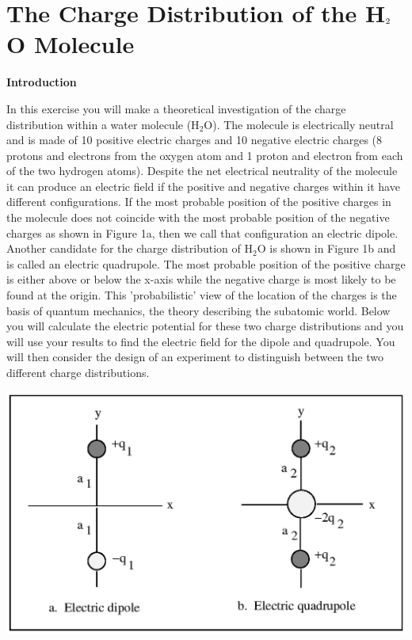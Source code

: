 
\section{The Charge Distribution of the H\protect\( _{2}\protect \)O Molecule}

\makelabheader %

\textbf{Introduction}

In this exercise you will make a theoretical investigation of the
charge distribution within a water molecule (H\( _{2} \)O). The molecule
is electrically neutral and is made of 10 positive electric charges
and 10 negative electric charges (8 protons and electrons from the
oxygen atom and 1 proton and electron from each of the two hydrogen
atoms). Despite the net electrical neutrality of the molecule it can
produce an electric field if the positive and negative charges within
it have different configurations. If the most probable position of
the positive charges in the molecule does not coincide with the most
probable position of the negative charges as shown in Figure 1a, then
we call that configuration an electric dipole. Another candidate for
the charge distribution of H\( _{2} \)O is shown in Figure 1b and
is called an electric quadrupole. The most probable position of the
positive charge is either above or below the x-axis while the negative
charge is most likely to be found at the origin. This 'probabilistic'
view of the location of the charges is the basis of quantum mechanics,
the theory describing the subatomic world. Below you will calculate
the electric potential for these two charge distributions and you
will use your results to find the electric field for the dipole and
quadrupole. You will then consider the design of an experiment to
distinguish between the two different charge distributions.

\vspace{0.3cm}
{\centering \includegraphics{charge_dist_water_mol/charge_dist_water_mol_fig_1.eps} \par}
\vspace{0.3cm}

